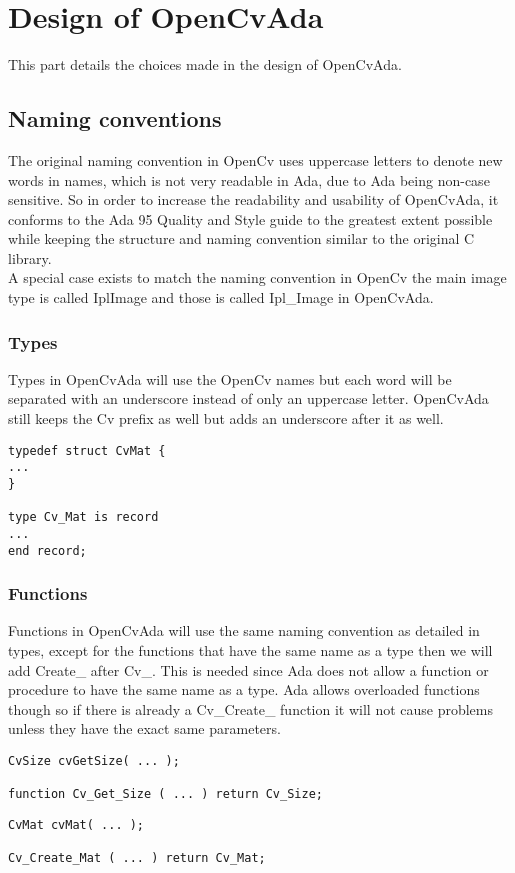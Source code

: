 \chapter{Design of OpenCvAda}
This part details the choices made in the design of OpenCvAda.
\section{Naming conventions}
The original naming convention in OpenCv uses uppercase letters to denote new words in names, which is not very readable in Ada, due to Ada being non-case sensitive. So in order to increase the readability and usability of OpenCvAda, it conforms to the Ada 95 Quality and Style guide\cite{styleguide95} to the greatest extent possible while keeping the structure and naming convention similar to the original C library.
\\
A special case exists to match the naming convention in OpenCv the main image type is called IplImage and those is called Ipl_Image in OpenCvAda.
\subsection{Types}
Types in OpenCvAda will use the OpenCv names \cite{bradski2008learningbasic} but each word will be separated with an underscore instead of only an uppercase letter. OpenCvAda still keeps the Cv prefix as well but adds an underscore after it as well.
\\
\begin{lstlisting}
typedef struct CvMat {
...
}

type Cv_Mat is record
...
end record;
\end{lstlisting}
\subsection{Functions}
Functions in OpenCvAda will use the same naming convention as detailed in types, except for the functions that have the same name as a type then we will add Create_ after Cv_. This is needed since Ada does not allow a function or procedure to have the same name as a type. Ada allows overloaded functions though so if there is already a Cv_Create_  function it will not cause problems unless they have the exact same parameters.
\\
\begin{lstlisting}
CvSize cvGetSize( ... );

function Cv_Get_Size ( ... ) return Cv_Size;
\end{lstlisting}
\begin{lstlisting}
CvMat cvMat( ... );

Cv_Create_Mat ( ... ) return Cv_Mat;
\end{lstlisting}
